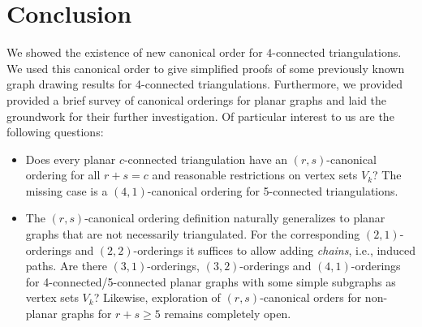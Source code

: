 \documentclass[12pt]{article}
\begin{document}
\section{Conclusion}
\label{se:concl}


We showed the existence of new canonical order for $4$-connected triangulations. We used this canonical order to give simplified proofs of some previously known graph drawing results for 4-connected triangulations. 
Furthermore, we provided provided a brief survey of canonical  orderings for planar graphs and laid the groundwork for their further investigation.   Of particular interest to us are the following questions:
\begin{itemize}
\item Does every planar $c$-connected triangulation have an $(r,s)$-canonical ordering for all $r+s=c$ and reasonable restrictions
	on vertex sets  $V_k$? 
The missing case is a $(4,1)$-canonical ordering for 5-connected triangulations.

\item The $(r,s)$-canonical ordering definition naturally generalizes to planar graphs that are not necessarily triangulated.
	For the corresponding $(2,1)$-orderings \cite{Kant96} and $(2,2)$-orderings \cite{NRN97}
	it suffices to allow adding {\em chains}, i.e., induced paths.  Are there $(3,1)$-orderings, $(3,2)$-orderings and $(4,1)$-orderings 
	for 4-connected/5-connected planar graphs with some simple subgraphs as vertex sets $V_k$?  Likewise, exploration of
	$(r,s)$-canonical orders for non-planar graphs for $r+s\geq 5$ remains completely open.
\end{itemize}
	
\end{document}
